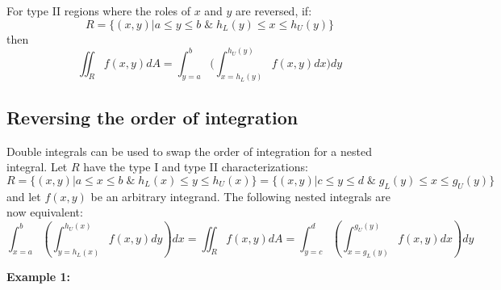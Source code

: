 \documentclass{article}
\begin{document}
For type II regions where the roles of \(x\) and \(y\) are reversed, if:
\[R = \{(x,y) | a \leq y \leq b \;\&\; h_L(y) \leq x \leq h_U(y)\}\]
then
\[\iint_R f(x,y)dA = \int_{y = a}^b \bigg(\int_{x = h_L(y)}^{h_U(y)} f(x,y)dx\bigg)dy\]


\subsection*{Reversing the order of integration}

Double integrals can be used to swap the order of integration for a nested integral. Let \(R\) have the type I and type II characterizations:
\[R = \{(x, y) | a \leq x \leq b \;\&\; h_L(x) \leq y \leq h_U(x)\} = \{(x, y) | c \leq y \leq d \;\&\; g_L(y) \leq x \leq g_U(y)\}\]
and let \(f(x,y)\) be an arbitrary integrand. The following nested integrals are now equivalent:
\[\int_{x = a}^b \left(\int_{y = h_L(x)}^{h_U(x)} f(x,y)dy\right)dx = \iint_R f(x,y)dA = \int_{y = c}^d \left(\int_{x = g_L(y)}^{g_U(y)} f(x,y)dx\right)dy\]



\pagebreak

\textbf{Example 1:}

\vspace{5mm}
\end{document}
